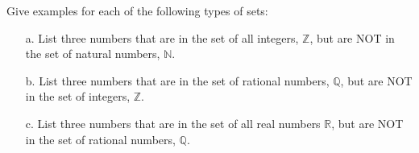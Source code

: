 \documentclass[a4paper,12pt]{book}
\newcounter{question}
\begin{document}
        \begin{questionNOGRADE}{\thequestion}
            Give examples for each of the following types of sets:

            \begin{enumerate}
                \item[a.]   List three numbers that are in the
                    set of all integers, $\mathbb{Z}$,
                    but are NOT in the set of natural numbers,
                    $\mathbb{N}$.

                \item[b.]   List three numbers that are in the
                    set of rational numbers, $\mathbb{Q}$,
                    but are NOT in the set of integers,
                    $\mathbb{Z}$.

                \item[c.]   List three numbers that are in the
                    set of all real numbers $\mathbb{R}$,
                    but are NOT in the set of rational numbers,
                    $\mathbb{Q}$.
            \end{enumerate}
        \end{questionNOGRADE}

        \notonkey{ \newpage }{ \hrulefill }

\end{document}
